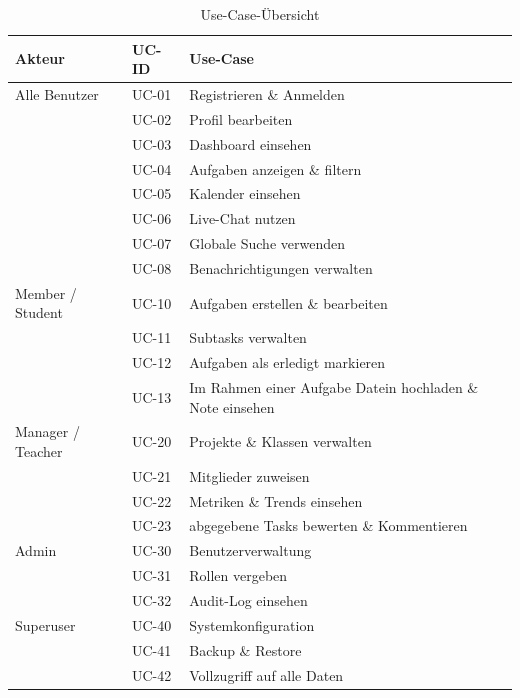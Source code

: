 \begin{table}[H]
    \centering
    \caption{Use-Case-Übersicht}
    \begin{tabularx}{\textwidth}{llX}
        \toprule
        \textbf{Akteur} & \textbf{UC-ID} & \textbf{Use-Case} \\
        \midrule
        Alle Benutzer
          & UC-01 & Registrieren \& Anmelden \\
          & UC-02 & Profil bearbeiten \\
          & UC-03 & Dashboard einsehen \\
          & UC-04 & Aufgaben anzeigen \& filtern \\
          & UC-05 & Kalender einsehen \\
          & UC-06 & Live-Chat nutzen \\
          & UC-07 & Globale Suche verwenden \\
          & UC-08 & Benachrichtigungen verwalten \\
        \midrule
        Member / Student
          & UC-10 & Aufgaben erstellen \& bearbeiten \\
          & UC-11 & Subtasks verwalten \\
          & UC-12 & Aufgaben als erledigt markieren \\
          & UC-13 & Im Rahmen einer Aufgabe Datein hochladen \& Note einsehen\\
        \midrule
        Manager / Teacher
          & UC-20 & Projekte \& Klassen verwalten \\
          & UC-21 & Mitglieder zuweisen \\
          & UC-22 & Metriken \& Trends einsehen \\
          & UC-23 & abgegebene Tasks bewerten \& Kommentieren \\
        \midrule
        Admin
          & UC-30 & Benutzerverwaltung \\
          & UC-31 & Rollen vergeben \\
          & UC-32 & Audit-Log einsehen \\
        \midrule
        Superuser
          & UC-40 & Systemkonfiguration \\
          & UC-41 & Backup \& Restore \\
          & UC-42 & Vollzugriff auf alle Daten \\
        \bottomrule
    \end{tabularx}
    \label{tab:usecases}
\end{table}

